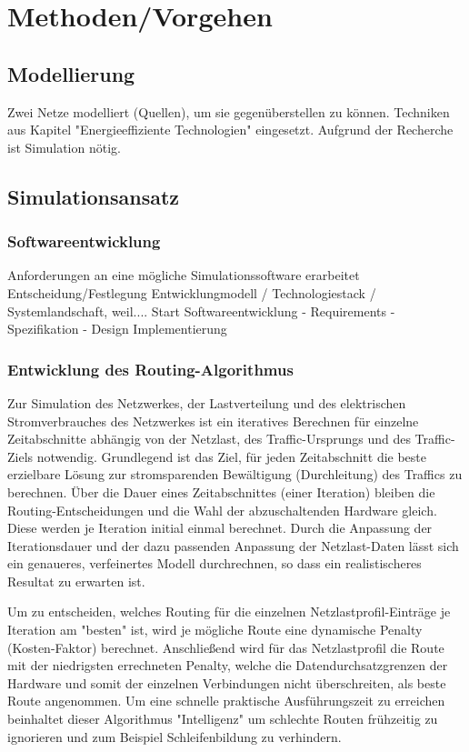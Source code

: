 \documentclass[12pt,titlepage]{article}
\begin{document}
\section{Methoden/Vorgehen}




\subsection{Modellierung}
Zwei Netze modelliert (Quellen), um sie gegenüberstellen zu können. Techniken aus Kapitel "Energieeffiziente Technologien" eingesetzt.
Aufgrund der Recherche ist Simulation nötig.

\subsection{Simulationsansatz}
\subsubsection{Softwareentwicklung}

Anforderungen an eine mögliche Simulationssoftware erarbeitet
Entscheidung/Festlegung Entwicklungmodell / Technologiestack / Systemlandschaft, weil....
Start Softwareentwicklung
	- Requirements
	- Spezifikation
	- Design
Implementierung
\subsubsection{Entwicklung des Routing-Algorithmus}
Zur Simulation des Netzwerkes, der Lastverteilung und des elektrischen Stromverbrauches des Netzwerkes ist ein iteratives Berechnen für einzelne Zeitabschnitte abhängig von der Netzlast, des Traffic-Ursprungs und des Traffic-Ziels notwendig. Grundlegend ist das Ziel, für jeden Zeitabschnitt die beste erzielbare Lösung zur stromsparenden Bewältigung (Durchleitung) des Traffics zu berechnen. Über die Dauer eines Zeitabschnittes (einer Iteration) bleiben die Routing-Entscheidungen und die Wahl der abzuschaltenden Hardware gleich. Diese werden je Iteration initial einmal berechnet. Durch die Anpassung der Iterationsdauer und der dazu passenden Anpassung der Netzlast-Daten lässt sich ein genaueres, verfeinertes Modell durchrechnen, so dass ein realistischeres Resultat zu erwarten ist.

Um zu entscheiden, welches Routing für die einzelnen Netzlastprofil-Einträge je Iteration am "besten" ist, wird je mögliche Route eine dynamische Penalty (Kosten-Faktor) berechnet. Anschließend wird für das Netzlastprofil die Route mit der niedrigsten errechneten Penalty, welche die Datendurchsatzgrenzen der Hardware und somit der einzelnen Verbindungen nicht überschreiten, als beste Route angenommen. Um eine schnelle praktische Ausführungszeit zu erreichen beinhaltet dieser Algorithmus "Intelligenz" um schlechte Routen frühzeitig zu ignorieren und zum Beispiel Schleifenbildung zu verhindern.
\end{document}
